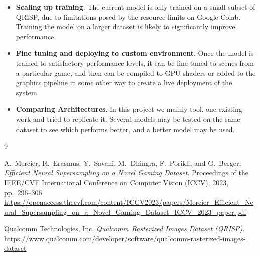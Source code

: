 \documentclass[11pt]{article}
\begin{document}
\begin{itemize}
    \item \textbf{Scaling up training}. The current model is only trained on a small subset of QRISP, due to limitations posed by the resource limits on Google Colab. Training the model on a larger dataset is likely to significantly improve performance
    
    \item \textbf{Fine tuning and deploying to custom environment}. Once the model is trained to satisfactory performance levels, it can be fine tuned to scenes from a particular game, and then can be compiled to GPU shaders or added to the graphics pipeline in some other way to create a live deployment of the system.
    
    \item \textbf{Comparing Architectures}. In this project we mainly took one existing work and tried to replicate it. Several models may be tested on the same dataset to see which performs better, and a better model may be used.
\end{itemize}

\begin{thebibliography}{9}

A.\ Mercier, R.\ Erasmus, Y.\ Savani, M.\ Dhingra, F.\ Porikli, and G.\ Berger.
\emph{Efficient Neural Supersampling on a Novel Gaming Dataset}.
Proceedings of the IEEE/CVF International Conference on Computer Vision (ICCV), 2023, pp.\ 296--306.
\url{https://openaccess.thecvf.com/content/ICCV2023/papers/Mercier_Efficient_Neural_Supersampling_on_a_Novel_Gaming_Dataset_ICCV_2023_paper.pdf}

Qualcomm Technologies, Inc.
\emph{Qualcomm Rasterized Images Dataset (QRISP)}.
\url{https://www.qualcomm.com/developer/software/qualcomm-rasterized-images-dataset}

\end{thebibliography}
\end{document}
